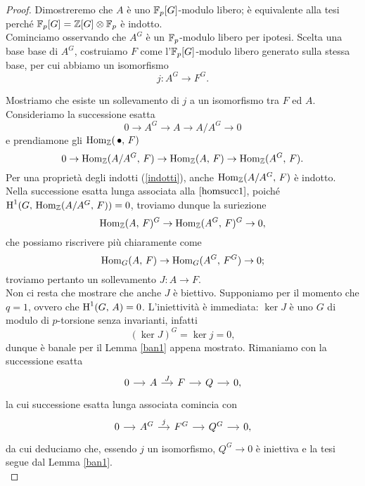 \begin{proof}
	Dimostreremo che $ A $ è uno $ \mathbb{F}_p[G] $-modulo libero; è equivalente alla tesi perché $ \mathbb{F}_p[G] = \mathbb{Z}[G] \otimes \mathbb{F}_p $ è indotto. \\
	
	Cominciamo osservando che $ A^G $ è un $ \mathbb{F}_p $-modulo libero per ipotesi. Scelta una base base di $ A^G $, costruiamo $ F $ come l'$ \mathbb{F}_p[G] $-modulo libero generato sulla stessa base, per cui abbiamo un isomorfismo
	\[ j \colon A^G \to F^G. \]
	
	Mostriamo che esiste un sollevamento di $ j $ a un isomorfismo tra $ F $ ed $ A $. Consideriamo la successione esatta
	\[ 0 \to A^G \to A \to A/A^G \to 0 \]
	e prendiamone gli $ \operatorname{Hom}_{\mathbb{Z}}(\, \bullet, \, F) $
	\begin{equation}\label{homsucc1}
		0 \to \operatorname{Hom}_{\mathbb{Z}}(A/A^G, \, F) \to \operatorname{Hom}_{\mathbb{Z}}(A, \, F) \to \operatorname{Hom}_{\mathbb{Z}}(A^G, \, F).
	\end{equation}
	Per una proprietà degli indotti (\ref{indotti}), anche $ \operatorname{Hom}_{\mathbb{Z}}(A/A^G, \, F) $ è indotto. Nella successione esatta lunga associata alla $ \ref{homsucc1} $, poiché $ \operatorname{H}^1(G, \, \operatorname{Hom}_{\mathbb{Z}}(A/A^G, \, F)) = 0 $, troviamo dunque la suriezione
	\[ \operatorname{Hom}_{\mathbb{Z}}(A, \, F)^G \to \operatorname{Hom}_{\mathbb{Z}}(A^G, \, F)^G \to 0, \]
	che possiamo riscrivere più chiaramente come
	\[ \operatorname{Hom}_G(A, \, F) \to \operatorname{Hom}_G(A^G, \, F^G) \to 0; \]
	troviamo pertanto un sollevamento $ J \colon A \to F $.\\
	
	Non ci resta che mostrare che anche $ J $ è biettivo. Supponiamo per il momento che $ q = 1 $, ovvero che $ \operatorname{H}^1(G, \, A) = 0 $. L'iniettività è immediata: $ \ker J $ è uno $ G $ di modulo di $ p $-torsione senza invarianti, infatti
	\[ (\ker J)^G = \ker j = 0, \]
	dunque è banale per il Lemma \ref{ban1} appena mostrato. Rimaniamo con la successione esatta
	\[ \begin{tikzcd}[column sep = small]
	0 \rar& A \rar["J"]& F \rar& Q \rar& 0,
	\end{tikzcd} \]
	la cui successione esatta lunga associata comincia con
	\[ \begin{tikzcd}[column sep = small]
	0 \rar & A^G \rar["j"] & F^G \rar & Q^G \rar & 0,
	\end{tikzcd} \]
	da cui deduciamo che, essendo $ j $ un isomorfismo, $ Q^G \to 0 $ è iniettiva e la tesi segue dal Lemma \ref{ban1}.\\
	

\end{proof}
